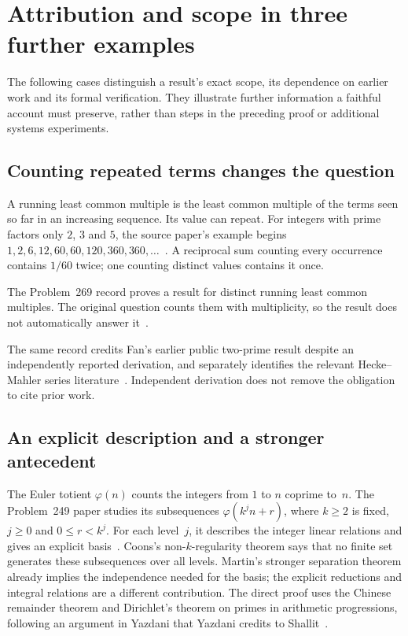 \documentclass[10pt]{article}
\begin{document}
\section{Attribution and scope in three further examples}\label{app:attribution}

The following cases distinguish a result's exact scope, its dependence on earlier work and its formal verification. They illustrate further information a faithful account must preserve, rather than steps in the preceding proof or additional systems experiments.

\subsection{Counting repeated terms changes the question}

A running least common multiple is the least common multiple of the terms seen so far in an increasing sequence. Its value can repeat. For integers with prime factors only $2$, $3$ and $5$, the source paper's example begins $1,2,6,12,60,60,120,360,360,\ldots$~\cite{paper269}. A reciprocal sum counting every occurrence contains $1/60$ twice; one counting distinct values contains it once.

The Problem~269 record proves a result for distinct running least common multiples. The original question counts them with multiplicity, so the result does not automatically answer it~\cite{paper269}.

The same record credits Fan's earlier public two-prime result despite an independently reported derivation, and separately identifies the relevant Hecke--Mahler series literature~\cite{paper269,fan269,loxtonvdp1977,bugeaudlaurent2023}. Independent derivation does not remove the obligation to cite prior work.

\subsection{An explicit description and a stronger antecedent}

The Euler totient $\varphi(n)$ counts the integers from $1$ to $n$ coprime to~$n$. The Problem~249 paper studies its subsequences $\varphi(k^j n+r)$, where $k\ge2$ is fixed, $j\ge0$ and $0\le r<k^j$. For each level~$j$, it describes the integer linear relations and gives an explicit basis~\cite{paper249}. Coons's non-$k$-regularity theorem says that no finite set generates these subsequences over all levels. Martin's stronger separation theorem already implies the independence needed for the basis; the explicit reductions and integral relations are a different contribution. The direct proof uses the Chinese remainder theorem and Dirichlet's theorem on primes in arithmetic progressions, following an argument in Yazdani that Yazdani credits to Shallit~\cite{coons,martin,yazdani}.
\end{document}
